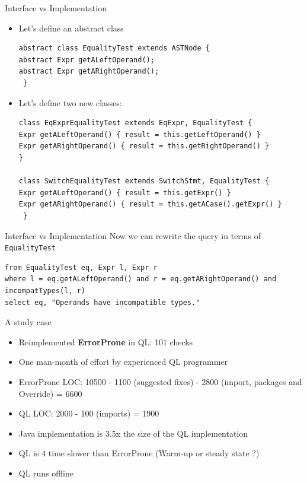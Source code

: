 \documentclass[usenames,dvipsnames]{beamer}
\begin{document}
\begin{frame}[fragile]{Interface vs Implementation}
\begin{itemize}
\item Let's define an abstract class
\begin{lstlisting}[language=JastAdd]
abstract class EqualityTest extends ASTNode {
abstract Expr getALeftOperand();
abstract Expr getARightOperand();
 }
\end{lstlisting}
\item Let's define two new classes:

\begin{lstlisting}[language=JastAdd]
class EqExprEqualityTest extends EqExpr, EqualityTest {
Expr getALeftOperand() { result = this.getLeftOperand() }
Expr getARightOperand() { result = this.getRightOperand() }
}

class SwitchEqualityTest extends SwitchStmt, EqualityTest {
Expr getALeftOperand() { result = this.getExpr() }
Expr getARightOperand() { result = this.getACase().getExpr() }
 }
\end{lstlisting}
\end{itemize}
\end{frame}

\begin{frame}[fragile]{Interface vs Implementation}
Now we can rewrite the query in terms of \texttt{EqualityTest}
\begin{lstlisting}[language=JastAdd]
from EqualityTest eq, Expr l, Expr r
where l = eq.getALeftOperand() and r = eq.getARightOperand() and incompatTypes(l, r)
select eq, "Operands have incompatible types."
\end{lstlisting}
\end{frame}

\begin{frame}{A study case}
\begin{itemize}
\item Reimplemented\textbf{ ErrorProne} in QL: 101 checks
\item One man-month of effort by experienced QL programmer
\item ErrorProne LOC: 10500 - 1100 (suggested fixes) - 2800 (import, packages and Override) = 6600
\item QL LOC: 2000 - 100 (imports) = 1900
\item Java implementation is 3.5x the size of the QL implementation
\item QL is 4 time slower than ErrorProne (Warm-up or steady state ?)
\item QL runs offline
\end{itemize}
\end{frame}
\end{document}
